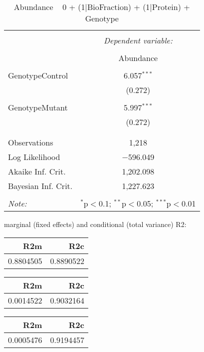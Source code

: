 \documentclass[11pt]{report}
\begin{document}
\begin{table}[!htbp] \centering 
  \caption{Abundance ~ 0 + (1|BioFraction) + (1|Protein) + Genotype} 
  \label{} 
\begin{tabular}{@{\extracolsep{5pt}}lc} 
\\[-1.8ex]\hline 
\hline \\[-1.8ex] 
 & \multicolumn{1}{c}{\textit{Dependent variable:}} \\ 
\cline{2-2} 
\\[-1.8ex] & Abundance \\ 
\hline \\[-1.8ex] 
 GenotypeControl & 6.057$^{***}$ \\ 
  & (0.272) \\ 
  & \\ 
 GenotypeMutant & 5.997$^{***}$ \\ 
  & (0.272) \\ 
  & \\ 
\hline \\[-1.8ex] 
Observations & 1,218 \\ 
Log Likelihood & $-$596.049 \\ 
Akaike Inf. Crit. & 1,202.098 \\ 
Bayesian Inf. Crit. & 1,227.623 \\ 
\hline 
\hline \\[-1.8ex] 
\textit{Note:}  & \multicolumn{1}{r}{$^{*}$p$<$0.1; $^{**}$p$<$0.05; $^{***}$p$<$0.01} \\ 
\end{tabular} 
\end{table} 
marginal (fixed effects) and conditional (total variance) R2:

\begin{tabular}{r|r}
\hline
R2m & R2c\\
\hline
0.8804505 & 0.8890522\\
\hline
\end{tabular}

\begin{tabular}{r|r}
\hline
R2m & R2c\\
\hline
0.0014522 & 0.9032164\\
\hline
\end{tabular}

\begin{tabular}{r|r}
\hline
R2m & R2c\\
\hline
0.0005476 & 0.9194457\\
\hline
\end{tabular}
\end{document}
